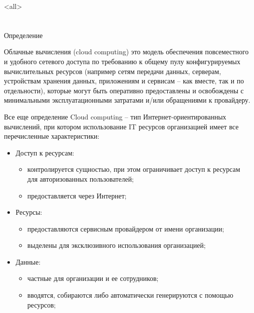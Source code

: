 

\subtitle{Облачные\\вычисления}



\mode<all>{}

%
%
\section{}

\begin{frame}{Определение}
	\begin{block}{Облачные вычисления (cloud computing)}
это модель обеспечения повсеместного и удобного сетевого доступа по требованию к общему пулу 
конфигурируемых вычислительных ресурсов (например сетям передачи данных,  серверам,  
устройствам хранения данных,  приложениям и сервисам -- как вместе,  так и по отдельности),  
которые могут быть оперативно предоставлены и освобождены с минимальными эксплуатационными 
затратами и/или обращениями к провайдеру.
	\end{block}
\end{frame}


\begin{frame}{Все еще определение}
Cloud computing -- тип Интернет-ориентированных вычислений, при котором использование IT ресурсов организацией имеет все перечисленные характеристики:

	\begin{itemize}
		\item Доступ к ресурсам:
		\begin{itemize}
			\item контролируется сущностью, при этом  ограничивает доступ к ресурсам для авторизованных пользователей;
			\item предоставляется через Интернет;
		\end{itemize}

	\item Ресурсы:
		\begin{itemize}
			\item предоставляются сервисным провайдером от имени организации;
			\item выделены для эксклюзивного использования организацией;
		\end{itemize}
	\item Данные:
		\begin{itemize}
			\item частные для организации и ее сотрудников;
			\item вводятся, собираются либо автоматически генерируются с помощью ресурсов;
		\end{itemize}
	\end{itemize}

\end{frame}


